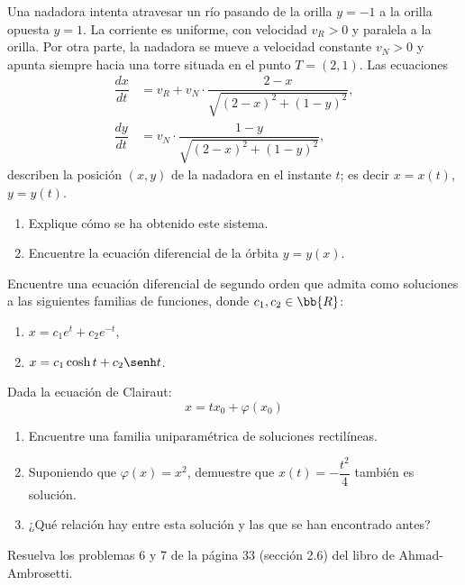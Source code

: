 \begin{ejercicio}
    Una nadadora intenta atravesar un río pasando de la orilla \(y = -1\) a la orilla opuesta \(y = 1\).
    La corriente es uniforme, con velocidad \(v_R > 0\) y paralela a la orilla.
    Por otra parte, la nadadora se mueve a velocidad constante \(v_N > 0\) y apunta siempre hacia una torre situada en el punto \(T = (2, 1)\).
    Las ecuaciones
    \begin{align*}
        \dfrac{dx}{dt} &= v_R + v_N \cdot \dfrac{2 - x}{\sqrt{(2 - x)^2 + (1 - y)^2}},\\
        \dfrac{dy}{dt} &= v_N \cdot \dfrac{1 - y}{\sqrt{(2 - x)^2 + (1 - y)^2}},
    \end{align*}
    describen la posición \((x, y)\) de la nadadora en el instante \(t\); es decir \(x = x(t)\), \(y = y(t)\).
    \begin{enumerate}
        \item Explique cómo se ha obtenido este sistema.
        \item Encuentre la ecuación diferencial de la órbita \(y = y(x)\).
    \end{enumerate}
\end{ejercicio}


\begin{ejercicio}
    Encuentre una ecuación diferencial de segundo orden que admita como soluciones a las siguientes familias de funciones, donde \(c_1, c_2 \in \bb{R}\):
    \begin{enumerate}
        \item \(x = c_1e^t + c_2e^{-t}\),
        \item \(x = c_1\cosh t + c_2\senh t\).
    \end{enumerate}
\end{ejercicio}


\begin{ejercicio}
    Dada la ecuación de Clairaut:
    \begin{equation*}
        x = tx_0 + \varphi(x_0)
    \end{equation*}
    \begin{enumerate}
        \item Encuentre una familia uniparamétrica de soluciones rectilíneas.
        \item Suponiendo que \(\varphi(x) = x^2\), demuestre que \(x(t) = -\dfrac{t^2}{4}\) también es solución.
        \item ¿Qué relación hay entre esta solución y las que se han encontrado antes?
    \end{enumerate}
\end{ejercicio}

\begin{ejercicio}
    Resuelva los problemas 6 y 7 de la página 33 (sección 2.6) del libro de Ahmad-Ambrosetti.
\end{ejercicio}

